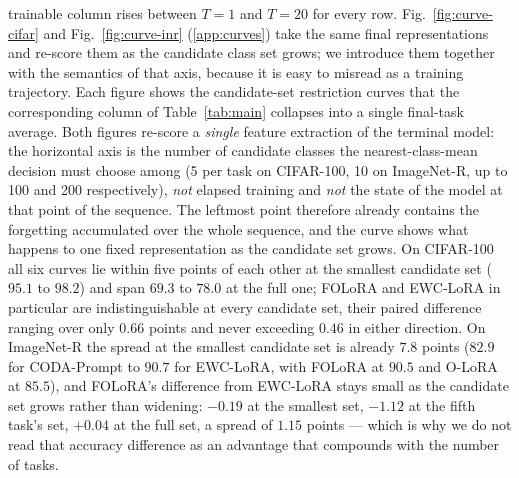trainable column rises between $T{=}1$ and $T{=}20$ for every row.
Fig.~\ref{fig:curve-cifar} and Fig.~\ref{fig:curve-inr} (\ref{app:curves}) take the same final representations
and re-score them as the candidate class set grows; we introduce them together with the
semantics of that axis, because it is easy to misread as a training trajectory. Each figure
shows the candidate-set restriction curves that the corresponding column of
Table~\ref{tab:main} collapses into a single final-task average.
Both figures re-score a \emph{single} feature extraction of the terminal model: the
horizontal axis is the number of candidate classes the nearest-class-mean decision must
choose among (5 per task on CIFAR-100, 10 on ImageNet-R, up to 100 and 200 respectively),
\emph{not} elapsed training and \emph{not} the state of the model at that point of the
sequence. The leftmost point therefore already contains the forgetting accumulated over the
whole sequence, and the curve shows what happens to one fixed representation as the
candidate set grows. On
CIFAR-100 all six curves lie within five points of each other at the smallest candidate set
($95.1$ to $98.2$) and span $69.3$ to $78.0$ at the full one; FOLoRA and EWC-LoRA in
particular are indistinguishable at every candidate set, their paired difference ranging
over only $0.66$ points and never exceeding $0.46$ in either direction. On ImageNet-R the
spread at the smallest candidate set is already $7.8$ points ($82.9$ for CODA-Prompt to
$90.7$ for EWC-LoRA, with FOLoRA at $90.5$ and O-LoRA at $85.5$), and FOLoRA's difference
from EWC-LoRA stays small as the candidate set grows rather than widening: $-0.19$ at the
smallest set, $-1.12$ at the fifth task's set, $+0.04$ at the full set, a spread of $1.15$
points --- which is why we do not read that accuracy difference as an advantage that
compounds with the number of tasks.

